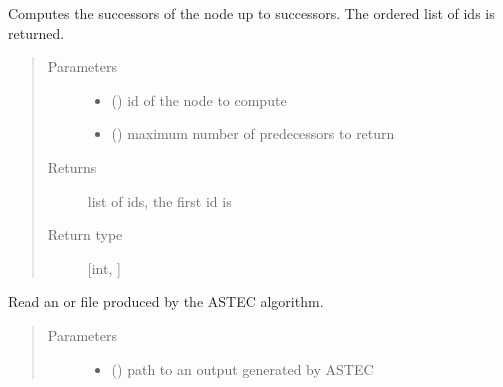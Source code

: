 \documentclass[letterpaper,10pt,english]{sphinxmanual}
\begin{document}
\begin{fulllineitems}
\begin{fulllineitems}
\end{fulllineitems}


\begin{fulllineitems}
\label{\detokenize{index:LineageTree.lineageTree.get_successors}}
Computes the successors of the node  up to
 successors. The ordered list of ids is returned.
\begin{quote}\begin{description}
\item[{Parameters}] \leavevmode\begin{itemize}
\item {} 
 () \textendash{} id of the node to compute

\item {} 
 () \textendash{} maximum number of predecessors to return

\end{itemize}

\item[{Returns}] \leavevmode
list of ids, the first id is 

\item[{Return type}] \leavevmode
{[}int, {]}

\end{description}\end{quote}

\end{fulllineitems}


\begin{fulllineitems}
\label{\detokenize{index:LineageTree.lineageTree.read_from_ASTEC}}
Read an  or  file produced by the ASTEC algorithm.
\begin{quote}\begin{description}
\item[{Parameters}] \leavevmode\begin{itemize}
\item {} 
 () \textendash{} path to an output generated by ASTEC


\end{itemize}
\end{description}
\end{quote}
\end{fulllineitems}
\end{fulllineitems}
\end{document}
